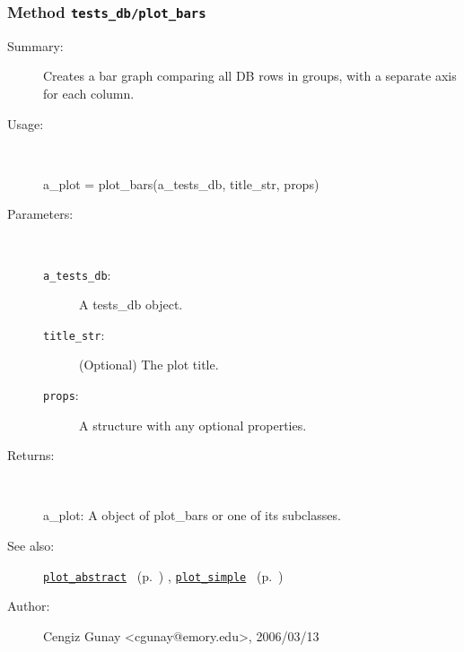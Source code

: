 \subsubsection[Method \texttt{plot\_bars}]{Method \texttt{tests\_db/plot\_bars}}%
%
\label{ref_tests_db__plot_bars}%
\hypertarget{ref_tests_db__plot_bars}{}%
\begin{description}
\item[Summary:]Creates a bar graph comparing all DB rows in groups, with a separate axis for each column.
%
\item[Usage:]~%
\begin{lyxcode}%
a\_plot = plot\_bars(a\_tests\_db, title\_str, props)
%
\end{lyxcode}%
%
%
\item[Parameters:]~
\begin{description}%
\item[\texttt{a\_tests\_db}:]
 A tests\_db object.
\item[\texttt{title\_str}:]
 (Optional) The plot title.
\item[\texttt{props}:]
 A structure with any optional properties.
\end{description}%
%
\item[Returns:]~

	a\_plot: A object of plot\_bars or one of its subclasses.
%
%
\item[See also:]%
\hyperlink{ref_plot_abstract}{\texttt{plot\_abstract}}%
\ (p.~\pageref{ref_plot_abstract})%
%
, \hyperlink{ref_plot_simple}{\texttt{plot\_simple}}%
\ (p.~\pageref{ref_plot_simple})%
%
%
\item[Author:]%
Cengiz Gunay <cgunay@emory.edu>, 2006/03/13%
\end{description}
\methodline%
